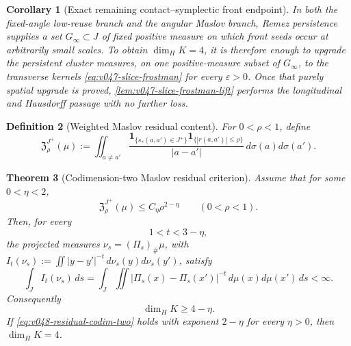 \documentclass[10pt]{article}
\newtheorem{theorem}{Theorem}[section]
\newtheorem{corollary}[theorem]{Corollary}
\newtheorem{definition}[theorem]{Definition}
\begin{document}
\begin{corollary}[Exact remaining contact--symplectic front endpoint]
\label{cor:v047-exact-spatial-endpoint}
In both the fixed-angle low-reuse branch and the angular Maslov branch, Remez persistence supplies a
set \(G_\infty\subset J\) of fixed positive measure on which front seeds occur at arbitrarily small
scales.  To obtain \(\dim_HK=4\), it is therefore enough to upgrade the persistent cluster measures,
on one positive-measure subset of \(G_\infty\), to the transverse kernels
\eqref{eq:v047-slice-frostman} for every \(\varepsilon>0\).  Once that purely spatial upgrade is
proved, \cref{lem:v047-slice-frostman-lift} performs the longitudinal and Hausdorff passage with no
further loss.
\end{corollary}

\begin{definition}[Weighted Maslov residual content]
\label{def:v048-maslov-residual-content}
For \(0<\rho<1\), define
\begin{equation}
\label{eq:v048-maslov-residual-content}
\boxed{
\mathfrak Z_\rho^{J^+}(\mu)
:=
\iint_{a\ne a'}
\frac{
\mathbf 1_{\{s_*(a,a')\in J^+\}}
\mathbf 1_{\{|r(a,a')|\le\rho\}}
}{|a-a'|}
\,d\sigma(a)d\sigma(a').
}
\end{equation}
\end{definition}

\begin{theorem}[Codimension-two Maslov residual criterion]
\label{thm:v048-residual-frostman-criterion}
Assume that for some \(0<\eta<2\),
\begin{equation}
\label{eq:v048-residual-codim-two}
\boxed{
\mathfrak Z_\rho^{J^+}(\mu)
\le
C_\eta\rho^{2-\eta}
\qquad(0<\rho<1).
}
\end{equation}
Then, for every
\[
1<t<3-\eta,
\]
the projected measures \(\nu_s=(\Pi_s)_\#\mu\), with
\(I_t(\nu_s):=\iint|y-y'|^{-t}\,d\nu_s(y)d\nu_s(y')\), satisfy
\begin{equation}
\label{eq:v048-average-projection-energy}
\boxed{
\int_J I_t(\nu_s)\,ds
=
\int_J\iint
|\Pi_s(x)-\Pi_s(x')|^{-t}
\,d\mu(x)d\mu(x')\,ds
<\infty.
}
\end{equation}
Consequently
\begin{equation}
\label{eq:v048-residual-dimension-output}
\dim_HK\ge4-\eta.
\end{equation}
If \eqref{eq:v048-residual-codim-two} holds with exponent \(2-\eta\) for every \(\eta>0\), then
\(\dim_HK=4\).
\end{theorem}
\end{document}
